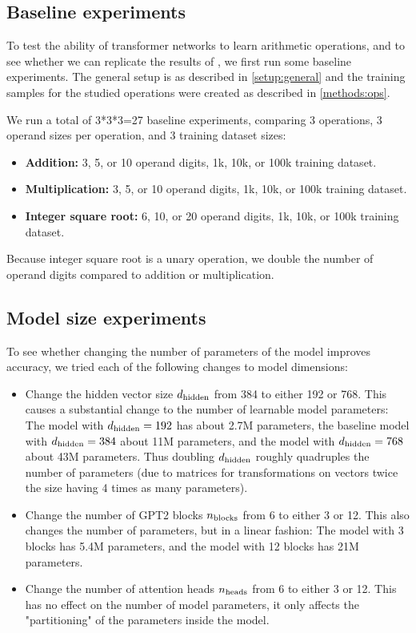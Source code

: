 \subsection{Baseline experiments}
\label{setup:baseline}

To test the ability of transformer networks to learn arithmetic operations, and to see whether we can replicate the results of \cite{teaching}, we first run some baseline experiments. The general setup is as described in \cref{setup:general} and the training samples for the studied operations were created as described in \cref{methods:ops}.



We run a total of 3*3*3=27 baseline experiments, comparing 3 operations, 3 operand sizes per operation, and 3 training dataset sizes:
 
\begin{itemize}
	\item \textbf{Addition:} 3, 5, or 10 operand digits, 1k, 10k, or 100k training dataset.
	\item \textbf{Multiplication:} 3, 5, or 10 operand digits, 1k, 10k, or 100k training dataset.
	\item \textbf{Integer square root:} 6, 10, or 20 operand digits, 1k, 10k, or 100k training dataset.
\end{itemize}


Because integer square root is a unary operation, we double the number of operand digits compared to addition or multiplication.



\subsection{Model size experiments}
\label{setup:modelsize}

To see whether changing the number of parameters of the model improves accuracy, we tried each of the following changes to model dimensions:

\begin{itemize}
	\item Change the hidden vector size ${d_\textrm{hidden}}$ from 384 to either 192 or 768. This causes a substantial change to the number of learnable model parameters: The model with ${d_\textrm{hidden}}=192$ has about 2.7M parameters, the baseline model with ${d_\textrm{hidden}}=384$ about 11M parameters, and the model with ${d_\textrm{hidden}}=768$ about 43M parameters. Thus doubling ${d_\textrm{hidden}}$ roughly quadruples the number of parameters (due to matrices for transformations on vectors twice the size having 4 times as many parameters).
	\item Change the number of GPT2 blocks ${n_\textrm{blocks}}$ from 6 to either 3 or 12. This also changes the number of parameters, but in a linear fashion: The model with 3 blocks has 5.4M parameters, and the model with 12 blocks has 21M parameters. 
	\item Change the number of attention heads ${n_\textrm{heads}}$ from 6 to either 3 or 12. This has no effect on the number of model parameters, it only affects the "partitioning" of the parameters inside the model.
\end{itemize}

